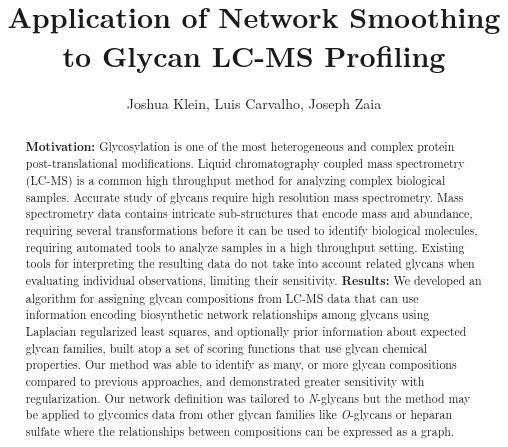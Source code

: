 \documentclass{article}
\newcommand{\nglycans}[0]{\textit{N}-glycans\xspace}
\begin{document}
\title{Application of Network Smoothing to Glycan LC-MS Profiling}
\author{Joshua Klein, Luis Carvalho, Joseph Zaia}
\begin{abstract}
\textbf{Motivation:} Glycosylation is one of the most heterogeneous
and complex protein post-translational modifications. Liquid chromatography
coupled mass spectrometry (LC-MS) is a common high throughput method for
analyzing complex biological samples. Accurate study of glycans require
high resolution mass spectrometry. Mass spectrometry data contains
intricate sub-structures that encode mass and abundance, requiring several
transformations before it can be used to identify biological molecules,
requiring automated tools to analyze samples in a high throughput setting.
Existing tools for interpreting the resulting data do not take into account
related glycans when evaluating individual observations, limiting their sensitivity.
\textbf{Results:} We developed an algorithm for assigning glycan compositions
from LC-MS data that can use information encoding biosynthetic network
relationships among glycans using Laplacian regularized least squares,
and optionally prior information about expected glycan families, built atop
a set of scoring functions that use glycan chemical properties. Our method
was able to identify as many, or more glycan compositions compared to
previous approaches, and demonstrated greater sensitivity with regularization.
Our network definition was tailored to \nglycans but the method may be applied
to glycomics data from other glycan families like \textit{O}-glycans or heparan
sulfate where the relationships between compositions can be expressed as a graph.
\end{abstract}

\maketitle












\end{document}
